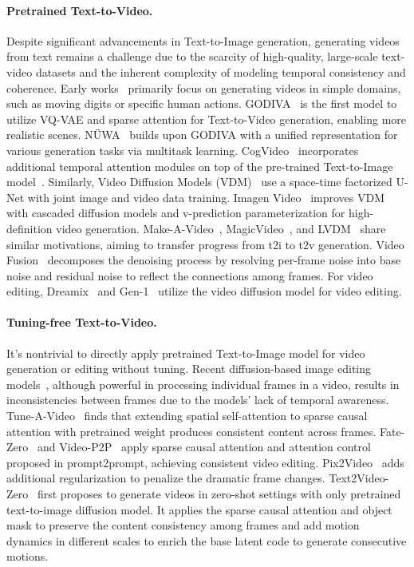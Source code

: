 \documentclass{article}
\begin{document}
\paragraph{Pretrained Text-to-Video.}
Despite significant advancements in Text-to-Image generation, generating videos from text remains a challenge due to the scarcity of high-quality, large-scale text-video datasets and the inherent complexity of modeling temporal consistency and coherence. Early works~\cite{mittal2017sync, pan2017create, marwah2017attentive, li2018video, gupta2018imagine, liu2019cross} primarily focus on generating videos in simple domains, such as moving digits or specific human actions. GODIVA~\cite{van2017neural} is the first model to utilize VQ-VAE and sparse attention for Text-to-Video generation, enabling more realistic scenes. NÜWA~\cite{wu2022nuwa} builds upon GODIVA with a unified representation for various generation tasks via multitask learning. CogVideo~\cite{hong2022cogvideo} incorporates additional temporal attention modules on top of the pre-trained Text-to-Image model~\cite{ding2022cogview2}. Similarly, Video Diffusion Models (VDM)~\cite{ho2022video} use a space-time factorized U-Net with joint image and video data training. Imagen Video~\cite{ho2022imagen} improves VDM with cascaded diffusion models and v-prediction parameterization for high-definition video generation. Make-A-Video~\cite{singer2022make}, MagicVideo~\cite{zhou2022magicvideo}, and LVDM~\cite{he2022latent} share similar motivations, aiming to transfer progress from t2i to t2v generation. Video Fusion~\cite{luo2023videofusion} decomposes the denoising process by resolving per-frame noise into base noise and residual noise to reflect the connections among frames. For video editing, Dreamix~\cite{molad2023dreamix} and Gen-1~\cite{esser2023structure} utilize the video diffusion model for video editing. 
\paragraph{Tuning-free Text-to-Video.}
It’s nontrivial to directly apply pretrained Text-to-Image model for video generation or editing without tuning. Recent diffusion-based image editing models~\cite{meng2021sdedit, hertz2022prompt, couairon2022diffedit, wu2022unifying, kawar2022imagic, tumanyan2022plug}, although powerful in processing individual frames in a video, results in inconsistencies between frames due to the models' lack of temporal awareness. Tune-A-Video~\cite{wu2022tune} finds that extending spatial self-attention to sparse causal attention with pretrained weight produces consistent content across frames. Fate-Zero~\cite{qi2023fatezero} and Video-P2P~\cite{liu2023video} apply sparse causal attention and attention control proposed in prompt2prompt, achieving consistent video editing. Pix2Video~\cite{ceylan2023pix2video} adds additional regularization to penalize the dramatic frame changes. Text2Video-Zero~\cite{khachatryan2023text2video} first proposes to generate videos in zero-shot settings with only pretrained text-to-image diffusion model. It applies the sparse causal attention and object mask to preserve the content consistency among frames and add motion dynamics in different scales to enrich the base latent code to generate consecutive motions. 
\end{document}
